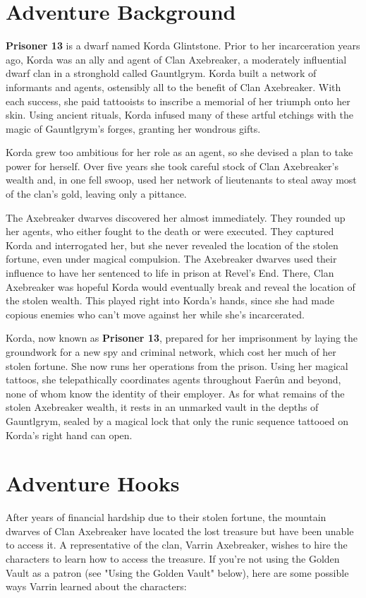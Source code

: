 \documentclass[10pt,a4paper,twoside,bg=print,twocolumn,openany,nodeprecatedcode]{dndbook}
\begin{document}
\section{Adventure Background}
\textbf{Prisoner 13} is a dwarf named Korda Glintstone. Prior to her incarceration years ago, Korda was an ally and agent of Clan Axebreaker, a moderately influential dwarf clan in a stronghold called Gauntlgrym. Korda built a network of informants and agents, ostensibly all to the benefit of Clan Axebreaker. With each success, she paid tattooists to inscribe a memorial of her triumph onto her skin. Using ancient rituals, Korda infused many of these artful etchings with the magic of Gauntlgrym's forges, granting her wondrous gifts.

Korda grew too ambitious for her role as an agent, so she devised a plan to take power for herself. Over five years she took careful stock of Clan Axebreaker's wealth and, in one fell swoop, used her network of lieutenants to steal away most of the clan's gold, leaving only a pittance.

The Axebreaker dwarves discovered her almost immediately. They rounded up her agents, who either fought to the death or were executed. They captured Korda and interrogated her, but she never revealed the location of the stolen fortune, even under magical compulsion. The Axebreaker dwarves used their influence to have her sentenced to life in prison at Revel's End. There, Clan Axebreaker was hopeful Korda would eventually break and reveal the location of the stolen wealth. This played right into Korda's hands, since she had made copious enemies who can't move against her while she's incarcerated.

Korda, now known as \textbf{Prisoner 13}, prepared for her imprisonment by laying the groundwork for a new spy and criminal network, which cost her much of her stolen fortune. She now runs her operations from the prison. Using her magical tattoos, she telepathically coordinates agents throughout Faerûn and beyond, none of whom know the identity of their employer. As for what remains of the stolen Axebreaker wealth, it rests in an unmarked vault in the depths of Gauntlgrym, sealed by a magical lock that only the runic sequence tattooed on Korda's right hand can open.

\section{Adventure Hooks}
After years of financial hardship due to their stolen fortune, the mountain dwarves of Clan Axebreaker have located the lost treasure but have been unable to access it. A representative of the clan, Varrin Axebreaker, wishes to hire the characters to learn how to access the treasure. If you're not using the Golden Vault as a patron (see "Using the Golden Vault" below), here are some possible ways Varrin learned about the characters:
\end{document}
